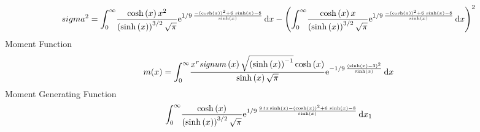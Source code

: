 \documentclass[12pt]{article}
\begin{document}
 $$ sigma^2 = \int_{0}^{\infty }\!{\frac {\cosh \left( x \right) {x}^{2}}{ \left( 
\sinh \left( x \right)  \right) ^{3/2}\sqrt {\pi}}{{\rm e}^{1/9\,{
\frac {- \left( \cosh \left( x \right)  \right) ^{2}+6\,\sinh \left( x
 \right) -8}{\sinh \left( x \right) }}}}}\,{\rm d}x- \left( \int_{0}^{
\infty }\!{\frac {\cosh \left( x \right) x}{ \left( \sinh \left( x
 \right)  \right) ^{3/2}\sqrt {\pi}}{{\rm e}^{1/9\,{\frac {- \left( 
\cosh \left( x \right)  \right) ^{2}+6\,\sinh \left( x \right) -8}{
\sinh \left( x \right) }}}}}\,{\rm d}x \right) ^{2}
$$Moment Function 
 $$ m(x) = \int_{0}^{\infty }\!{\frac {{x}^{r}{\it signum} \left( x \right) 
\sqrt { \left( \sinh \left( x \right)  \right) ^{-1}}\cosh \left( x
 \right) }{\sinh \left( x \right) \sqrt {\pi}}{{\rm e}^{-1/9\,{\frac {
 \left( \sinh \left( x \right) -3 \right) ^{2}}{\sinh \left( x
 \right) }}}}}\,{\rm d}x
$$ Moment Generating Function 
 $$\int_{0}^{\infty }\!{\frac {\cosh \left( x \right) }{ \left( \sinh
 \left( x \right)  \right) ^{3/2}\sqrt {\pi}}{{\rm e}^{1/9\,{\frac {9
\,tx\sinh \left( x \right) - \left( \cosh \left( x \right)  \right) ^{
2}+6\,\sinh \left( x \right) -8}{\sinh \left( x \right) }}}}}\,{\rm d}
x_{{1}}
$$
\end{document}

